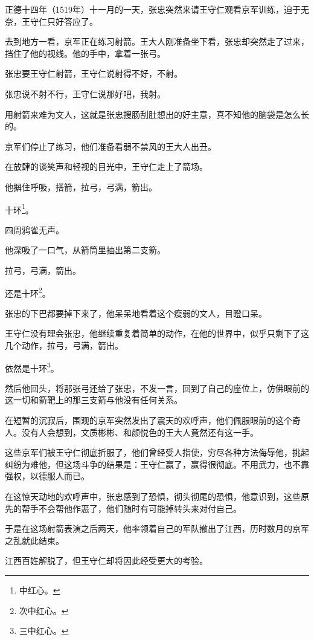 \begin{multicols}{\theparacolNo}
		正德十四年（1519年）十一月的一天，张忠突然来请王守仁观看京军训练，迫于无奈，王守仁只好答应了。

		去到地方一看，京军正在练习射箭。王大人刚准备坐下看，张忠却突然走了过来，挡住了他的视线。他的手中，拿着一张弓。

		张忠要王守仁射箭，王守仁说射得不好，不射。

		张忠说不射不行，王守仁说那好吧，我射。

		用射箭来难为文人，这就是张忠搜肠刮肚想出的好主意，真不知他的脑袋是怎么长的。

		京军们停止了练习，他们准备看弱不禁风的王大人出丑。

		在放肆的谈笑声和轻视的目光中，王守仁走上了箭场。

		他摒住呼吸，搭箭，拉弓，弓满，箭出。

		十环\footnote{中红心。}。

		四周鸦雀无声。

		他深吸了一口气，从箭筒里抽出第二支箭。

		拉弓，弓满，箭出。

		还是十环\footnote{次中红心。}。

		张忠的下巴都要掉下来了，他呆呆地看着这个瘦弱的文人，目瞪口呆。

		王守仁没有理会张忠，他继续重复着简单的动作，在他的世界中，似乎只剩下了这几个动作，拉弓，弓满，箭出。

		依然是十环\footnote{三中红心。}。

		然后他回头，将那张弓还给了张忠，不发一言，回到了自己的座位上，仿佛眼前的这一切和箭靶上的那三支箭与他没有任何关系。

		在短暂的沉寂后，围观的京军突然发出了震天的欢呼声，他们佩服眼前的这个奇人。没有人会想到，文质彬彬、和颜悦色的王大人竟然还有这一手。

		这些京军们被王守仁彻底折服了，他们曾经受人指使，穷尽各种方法侮辱他，挑起纠纷为难他，但这场斗争的结果是：王守仁赢了，赢得很彻底。不用武力，也不靠强权，以德服人而已。

		在这惊天动地的欢呼声中，张忠感到了恐惧，彻头彻尾的恐惧，他意识到，这些原先的帮手不会帮他作恶了，他们随时有可能掉转头来对付自己。

		于是在这场射箭表演之后两天，他率领着自己的军队撤出了江西，历时数月的京军之乱就此结束。

		江西百姓解脱了，但王守仁却将因此经受更大的考验。
		\ifnum{}
	\end{multicols}
\fi
\newpage
